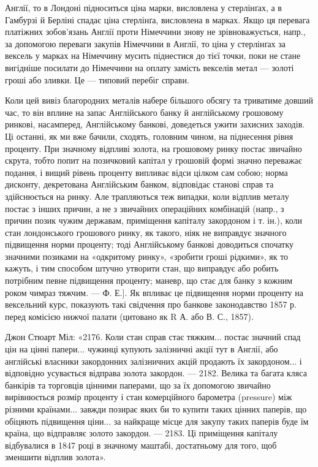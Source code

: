 \parcont{}  %
Англії, то в Лондоні підноситься ціна марки, висловлена у стерлінґах, а в Гамбурзі
й Берліні спадає ціна стерлінґа, висловлена в марках. Якщо ця перевага
платіжних зобов’язань Англії проти Німеччини знову не зрівноважується, напр.,
за допомогою переваги закупів Німеччини в Англії, то ціна у стерлінґах за
вексель у марках на Німеччину мусить піднестися до тієї точки, поки не стане
вигідніше посилати до Німеччини на оплату замість векселів метал — золоті гроші
або зливки. Це — типовий перебіг справи.

Коли цей вивіз благородних металів набере більшого обсягу та триватиме
довший час, то він вплине на запас Англійського банку й англійському грошовому
ринкові, насамперед, Англійському банкові, доведеться ужити захисних заходів.
Ці останні, як ми вже бачили, сходять, головним чином, на піднесення
рівня проценту. При значному відпливі золота, на грошовому ринку постає звичайно
скрута, тобто попит на позичковий капітал у грошовій формі значно
переважає подання, і вищий рівень проценту випливає відси цілком сам собою;
норма дисконту, декретована Англійським банком, відповідає станові справ та
здійснюється на ринку. Але трапляються теж випадки, коли відплив металу
постає з інших причин, а не з звичайних операційних комбінацій (напр., з причин
позик чужим державам, приміщення капіталу закордоном і т. ін.), коли стан
лондонського грошового ринку, як такого, ніяк не виправдує значного підвищення
норми проценту; тоді Англійському банкові доводиться спочатку значними
позиками на «одкритому ринку», «зробити гроші рідкими», як то кажуть, і тим
способом штучно утворити стан, що виправдує або робить потрібним певне підвищення
проценту; маневр, що стає для банку з кожним роком чимраз тяжчим. —
Ф. Е.]. Як впливає це підвищення норми проценту на вексельний курс, показують
такі свідчення про банкове законодавство 1857 р. перед комісією нижчої
палати (цитовано як R А. або В. С., 1857).

Джон Стюарт Міл: «2176. Коли стан справ стає тяжким... постає значний
спад цін на цінні папери... чужинці купують залізничні акції тут в Англії,
або англійські власники закордонних залізничних акцій продають їх закордоном...
і відповідно усувається відправа золота закордон. — 2182. Велика та багата
кляса банкірів та торговців цінними паперами, що за їх допомогою звичайно
вирівнюється розмір проценту і стан комерційного барометра (pressure) між
різними країнами... завжди позирає яких би то купити таких цінних паперів,
що обіцяють підвищення ціни... за найкраще місце для закупу таких
паперів буде їм країна, що відправляє золото закордон. — 2183. Ці приміщення
капіталу відбувалися в 1847 році в значному маштабі, достатньому для того, щоб
зменшити відплив золота».

